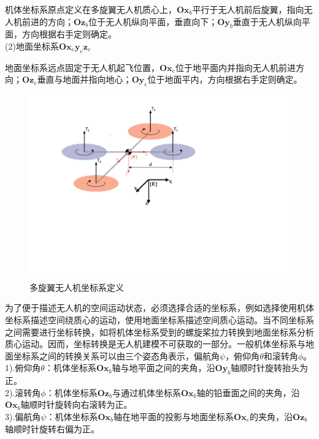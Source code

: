 机体坐标系原点定义在多旋翼无人机质心上，$\boldsymbol{O} \boldsymbol{x}_b$平行于无人机前后旋翼，指向无人机前进的方向；$\boldsymbol{O} \boldsymbol{z}_b$位于无人机纵向平面，垂直向下；$\boldsymbol{O} \boldsymbol{y}_b$垂直于无人机纵向平面，方向根据右手定则确定。 \\ 
(2)地面坐标系$\boldsymbol{O} \boldsymbol{x}_e \boldsymbol{y}_e \boldsymbol{z}_e$

地面坐标系远点固定于无人机起飞位置，$\boldsymbol{O} \boldsymbol{x}_e$位于地平面内并指向无人机前进方向；$\boldsymbol{O} \boldsymbol{z}_e$垂直与地面并指向地心；$\boldsymbol{O} \boldsymbol{y}_e$位于地面平内，方向根据右手定则确定。

\begin{figure}[h]
\centering
\includegraphics[scale=0.7,angle=-90]{figures/Fig2-2.pdf}
\caption{多旋翼无人机坐标系定义}
\label{fig2.2}
\end{figure}

为了便于描述无人机的空间运动状态，必须选择合适的坐标系，例如选择使用机体坐标系描述空间绕质心的运动，使用地面坐标系描述空间质心运动。当不同坐标系之间需要进行坐标转换，如将机体坐标系受到的螺旋桨拉力转换到地面坐标系分析质心运动。因而，坐标转换是无人机建模不可获取的一部分。一般机体坐标系与地面坐标系之间的转换关系可以由三个姿态角表示，偏航角$\psi$，俯仰角$\theta$和滚转角$\phi$。\\
1).俯仰角$\theta$：机体坐标系$\boldsymbol{O} \boldsymbol{x}_b$轴与地平面之间的夹角，沿$\boldsymbol{O} \boldsymbol{y}_b$轴顺时针旋转抬头为正。\\
2).滚转角$\phi$：机体坐标系$\boldsymbol{O} \boldsymbol{z}_b$与通过机体坐标系$\boldsymbol{O} \boldsymbol{x}_b$轴的铅垂面之间的夹角，沿$\boldsymbol{O} \boldsymbol{x}_b$轴顺时针旋转向右滚转为正。\\
3).偏航角$\psi$：机体坐标系$\boldsymbol{O} \boldsymbol{x}_b$轴在地平面的投影与地面坐标系$\boldsymbol{O} \boldsymbol{x}_e$的夹角，沿$\boldsymbol{O} \boldsymbol{z}_b$轴顺时针旋转右偏为正。

